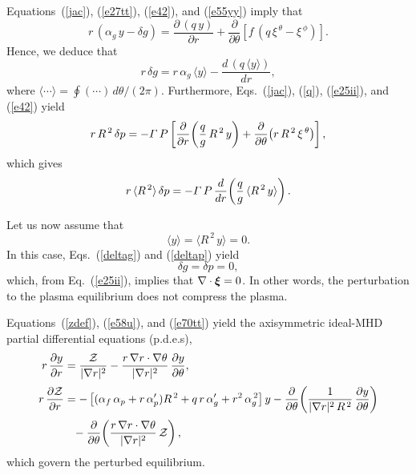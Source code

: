 \documentclass[12pt,prb,aps]{revtex4-1}
\newcommand {\bxi}{\mbox{\boldmath$\xi$}}
\begin{document}
Equations~(\ref{jac}), (\ref{e27tt}), (\ref{e42}), and (\ref{e55yy}) imply that
\begin{equation}
r\,(\alpha_g\,y-\delta g) = \frac{\partial\,(q\,y)}{\partial r} + \frac{\partial}{\partial\theta}\!\left[f\,(q\,\xi^{\,\theta}-\xi^{\,\phi})\right].
\end{equation}
Hence, we deduce that
\begin{equation}\label{deltag}
r\,\delta g = r\,\alpha_g\,\langle y\rangle - \frac{d\,(q\,\langle y\rangle)}{dr},
\end{equation}
where $\langle \cdots\rangle = \oint(\cdots)\,d\theta/(2\pi)$. Furthermore, Eqs.~(\ref{jac}), (\ref{q}), (\ref{e25ii}), and (\ref{e42})   yield\,\cite{tj}
\begin{equation}
r\,R^{\,2}\,\delta p = - {\mit\Gamma}\,P\left[\frac{\partial}{\partial r}\!\left(\frac{q}{g}\,R^{\,2}\,y\right)+\frac{\partial}{\partial\theta}\!\left(r\,R^{\,2}\,\xi^{\,\theta}\right)\right],
\end{equation}
which gives
\begin{equation}\label{deltap}
r\,\langle R^{\,2}\rangle\,\delta p = -{\mit\Gamma}\,P\,\frac{d}{dr}\!\left(\frac{q}{g}\,\langle R^{\,2}\,y\rangle\right).
\end{equation}

Let us now assume that 
\begin{equation}\label{sym}
\langle y\rangle = \langle R^{\,2}\,y\rangle = 0.
\end{equation}
In this case, Eqs.~(\ref{deltag}) and (\ref{deltap}) yield 
\begin{equation}\label{e70tt}
\delta g = \delta p = 0,
\end{equation}
 which, from Eq.~(\ref{e25ii}),  implies that $\nabla\cdot\bxi=0$. In other words, the perturbation to the plasma equilibrium does not compress the plasma. 

Equations~(\ref{zdef}), (\ref{e58u}), and   (\ref{e70tt}) yield the  axisymmetric ideal-MHD partial differential equations (p.d.e.s),
\begin{align}\label{e63y}
r\,\frac{\partial y}{\partial r} &= \frac{{\cal Z}}{|\nabla r|^2} - \frac{r\,\nabla r\cdot\nabla\theta}{|\nabla r|^2}\,\frac{\partial y}{\partial\theta},\\[0.5ex]
r\,\frac{\partial {\cal Z}}{\partial r}&= -\left[(\alpha_f\,\alpha_p+ r\,\alpha_p')R^{\,2} + q\,r\,\alpha_g'+r^2\,\alpha_g^{\,2}\right]y-\frac{\partial}{\partial\theta}\!\left(\frac{1}{|\nabla r|^2\,R^{\,2}}\,\frac{\partial y}{\partial\theta}\right)\nonumber\\[0.5ex]
&\phantom{=} -\frac{\partial}{\partial\theta}\!\left(\frac{r\,\nabla r\cdot\nabla\theta}{|\nabla r|^2}\,{\cal Z}\right),\label{e64y}
\end{align}
which govern the perturbed equilibrium. 
\end{document}
